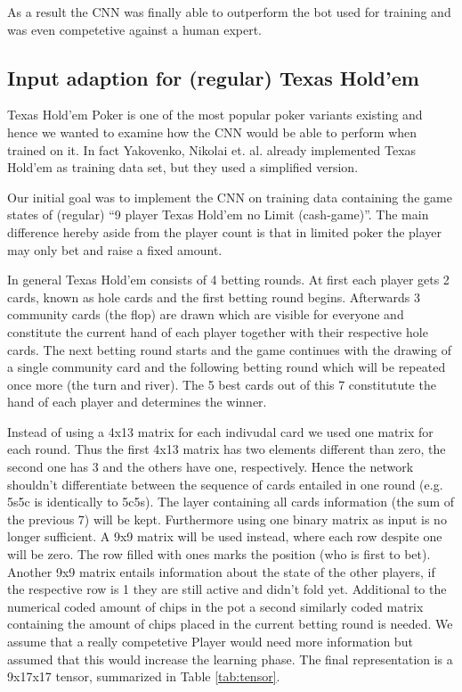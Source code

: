 \documentclass[]{report}
\begin{document}
As a result the CNN was finally able to outperform the bot used for
training and was even competetive against a human expert.

\subsection{Input adaption for (regular) Texas Hold'em \label{see:adapted_p} }

Texas Hold'em Poker is one of the most popular poker variants existing
and hence we wanted to examine how the CNN would be able to perform
when trained on it. In fact Yakovenko, Nikolai et. al. already implemented
Texas Hold'em as training data set, but they used a simplified version.

Our initial goal was to implement the CNN on training data containing
the game states of (regular) ``9 player Texas Hold'em no Limit (cash-game)''.
The main difference hereby aside from the player count is that in
limited poker the player may only bet and raise a fixed amount.

In general Texas Hold'em consists of 4 betting rounds. At first each
player gets 2 cards, known as hole cards and the first betting round
begins. Afterwards 3 community cards (the flop) are drawn which are
visible for everyone and constitute the current hand of each player
together with their respective hole cards. The next betting round
starts and the game continues with the drawing of a single community
card and the following betting round which will be repeated once more
(the turn and river). The 5 best cards out of this 7 constitutute
the hand of each player and determines the winner.

Instead of using a 4x13 matrix for each indivudal card we used one
matrix for each round. Thus the first 4x13 matrix has two elements
different than zero, the second one has 3 and the others have one,
respectively. Hence the network shouldn't differentiate between the
sequence of cards entailed in one round (e.g. 5s5c is identically
to 5c5s). The layer containing all cards information (the sum of the
previous 7) will be kept. Furthermore using one binary matrix as input
is no longer sufficient. A 9x9 matrix will be used instead, where
each row despite one will be zero. The row filled with ones marks
the position (who is first to bet). Another 9x9 matrix entails information
about the state of the other players, if the respective row is 1 they
are still active and didn't fold yet. Additional to the numerical
coded amount of chips in the pot a second similarly coded matrix containing
the amount of chips placed in the current betting round is needed.
We assume that a really competetive Player would need more information
but assumed that this would increase the learning phase. The final
representation is a 9x17x17 tensor, summarized in Table \ref{tab:tensor}.
\end{document}
